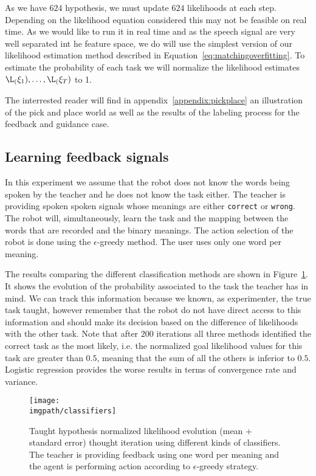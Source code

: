 As we have $624$ hypothesis, we must update $624$ likelihoods at each step. Depending on the likelihood equation considered this may not be feasible on real time. As we would like to run it in real time and as the speech signal are very well separated int he feature space, we do will use the simplest version of our likelihood estimation method described in Equation~\ref{eq:matchingoverfitting}. To estimate the probability of each task we will normalize the likelihood estimates $\L_(\xi_1),\ldots,\L_(\xi_T)$ to 1.

The interrested reader will find in appendix~\ref{appendix:pickplace} an illustration of the pick and place world as well as the results of the labeling process for the feedback and guidance case.

\subsection{Learning feedback signals}

In this experiment we assume that the robot does not know the words being spoken by the teacher and he does not know the task either. The teacher is providing spoken spoken signals whose meanings are either \texttt{correct} or \texttt{wrong}. The robot will, simultaneously, learn the task and the mapping between the words that are recorded and the binary meanings. The action selection of the robot is done using the $\epsilon$-greedy method. The user uses only one word per meaning.

The results comparing the different classification methods are shown in Figure~\ref{fig:FeedbackOneWord}. It shows the evolution of the probability associated to the task the teacher has in mind. We can track this information because we known, as experimenter, the true task taught, however remember that the robot do not have direct access to this information and should make its decision based on the difference of likelihoods with the other task. Note that after $200$ iterations all three methods identified the correct task as the most likely, i.e. the normalized goal likelihood values for this task are greater than $0.5$, meaning that the sum of all the others is inferior to $0.5$. Logistic regression provides the worse results in terms of convergence rate and variance.

\begin{figure}[!htbp]
  \centering
  \texttt{[image: \\imgpath/classifiers]}
  \caption{Taught hypothesis normalized likelihood evolution (mean + standard error) thought iteration using different kinds of classifiers. The teacher is providing feedback using one word per meaning and the agent is performing action according to $\epsilon$-greedy strategy.}
  \label{fig:FeedbackOneWord}
\end{figure}

